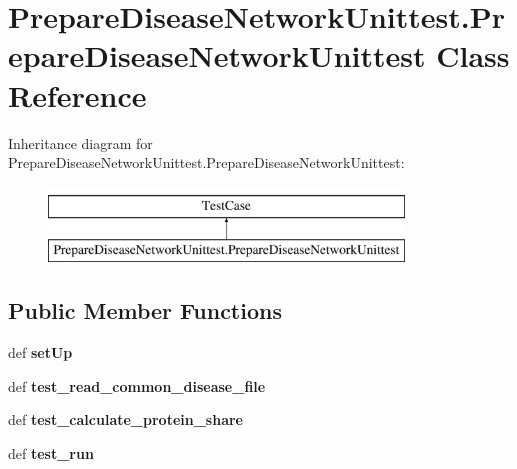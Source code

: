 \hypertarget{classPrepareDiseaseNetworkUnittest_1_1PrepareDiseaseNetworkUnittest}{\section{Prepare\-Disease\-Network\-Unittest.\-Prepare\-Disease\-Network\-Unittest Class Reference}
\label{classPrepareDiseaseNetworkUnittest_1_1PrepareDiseaseNetworkUnittest}
}
Inheritance diagram for Prepare\-Disease\-Network\-Unittest.\-Prepare\-Disease\-Network\-Unittest\-:\begin{figure}[H]
\begin{center}
\leavevmode
\includegraphics[height=2.000000cm]{classPrepareDiseaseNetworkUnittest_1_1PrepareDiseaseNetworkUnittest}
\end{center}
\end{figure}
\subsection*{Public Member Functions}
\begin{DoxyCompactItemize}
\item 
\hypertarget{classPrepareDiseaseNetworkUnittest_1_1PrepareDiseaseNetworkUnittest_a428b91977ae52870a83c1095f5eed4ca}{def {\bfseries set\-Up}}\label{classPrepareDiseaseNetworkUnittest_1_1PrepareDiseaseNetworkUnittest_a428b91977ae52870a83c1095f5eed4ca}

\item 
\hypertarget{classPrepareDiseaseNetworkUnittest_1_1PrepareDiseaseNetworkUnittest_af45630ba02b46f8a299dade8483b43b1}{def {\bfseries test\-\_\-read\-\_\-common\-\_\-disease\-\_\-file}}\label{classPrepareDiseaseNetworkUnittest_1_1PrepareDiseaseNetworkUnittest_af45630ba02b46f8a299dade8483b43b1}

\item 
\hypertarget{classPrepareDiseaseNetworkUnittest_1_1PrepareDiseaseNetworkUnittest_ac511fc48860f2d35235cf91a0c01dfb1}{def {\bfseries test\-\_\-calculate\-\_\-protein\-\_\-share}}\label{classPrepareDiseaseNetworkUnittest_1_1PrepareDiseaseNetworkUnittest_ac511fc48860f2d35235cf91a0c01dfb1}

\item 
\hypertarget{classPrepareDiseaseNetworkUnittest_1_1PrepareDiseaseNetworkUnittest_ae1c7a1845ba5e32300ebd87aa6570490}{def {\bfseries test\-\_\-run}}\label{classPrepareDiseaseNetworkUnittest_1_1PrepareDiseaseNetworkUnittest_ae1c7a1845ba5e32300ebd87aa6570490}

\end{DoxyCompactItemize}
